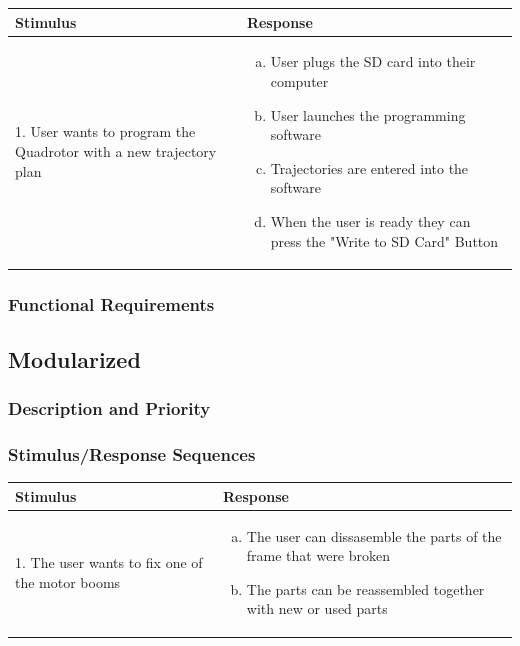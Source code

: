 \documentclass[english]{article}
\numberwithin{equation}{section} %
\begin{document}
\begin{longtable}{p{3cm} | p{10cm}}
\hline
\textbf{Stimulus} & \textbf{Response}\\
\hline
1. User wants to program the Quadrotor with a new trajectory plan &
\begin{enumerate}[(a)]\itemsep1pt %
\item User plugs the SD card into their computer
\item User launches the programming software
\item Trajectories are entered into the software
\item When the user is ready they can press the "Write to SD Card" Button
\end{enumerate}
\\ 
\hline
\end{longtable}



\subsubsection{Functional Requirements}
\bigskip
\subsection{Modularized} 
\subsubsection{Description and Priority}
\subsubsection{Stimulus/Response Sequences}

\begin{longtable}{p{3cm} | p{10cm}}
\hline
\textbf{Stimulus} & \textbf{Response}\\
\hline
1. The user wants to fix one of the motor booms &
\begin{enumerate}[(a)]\itemsep1pt %
\item The user can dissasemble the parts of the frame that were broken
\item The parts can be reassembled together with new or used parts
\end{enumerate}
\\ 
\hline
\end{longtable}
\end{document}
